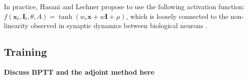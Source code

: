 In practice, Hasani and Lechner propose to use the following activation function: $f(\bm{x}_t, \bm{I}_t, \theta, A) = \tanh (w_r \bm{x} + w \bm{I} + \mu)$, which is loosely connected to the non-linearity observed in synaptic dynamics between biological neurons \cite{Lechner2020NeuralCP}.

\begin{table}[h!]
\centering
\caption{Time-Continuous Neural Network Classes}
\end{table}


\subsection{Training}

\textbf{Discuss BPTT and the adjoint method here}

